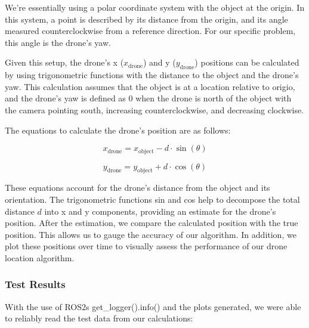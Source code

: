 We're essentially using a polar coordinate system with the object at the origin. In this system, a point is described by its distance from the origin, and its angle measured counterclockwise from a reference direction. For our specific problem, this angle is the drone's yaw.

Given this setup, the drone's x ($x_{\text{drone}}$) and y ($y_{\text{drone}}$) positions can be calculated by using trigonometric functions with the distance to the object and the drone's yaw. This calculation assumes that the object is at a location relative to origio, and the drone's yaw is defined as 0 when the drone is north of the object with the camera pointing south, increasing counterclockwise, and decreasing clockwise.

The equations to calculate the drone's position are as follows:

\begin{equation}
x_{\text{drone}} = x_{\text{object}} - d \cdot \sin(\theta)
\end{equation}

\begin{equation}
y_{\text{drone}} = y_{\text{object}} + d \cdot \cos(\theta)
\end{equation}

These equations account for the drone's distance from the object and its orientation. The trigonometric functions sin and cos help to decompose the total distance $d$ into x and y components, providing an estimate for the drone's position. After the estimation, we compare the calculated position with the true position. This allows us to gauge the accuracy of our algorithm. In addition, we plot these positions over time to visually assess the performance of our drone location algorithm.

\subsubsection{Test Results}

With the use of ROS2s get\_logger().info() and the plots generated, we were able to reliably read the test data from our calculations:

\begin{table}[h]
\centering
{}
\caption{Drone Position Testing Data}
\label{tab:qssTest}
\end{table}


